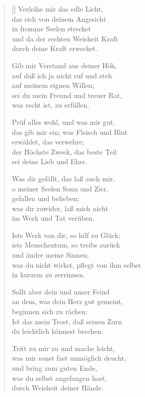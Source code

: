 \begin{multicols}{2}
\begin{verse}[\versewidth]
 Verleihe mir das edle Licht,\\
das sich von deinem Angesicht\\
in fromme Seelen strecket\\
und da der rechten Weisheit Kraft\\
durch deine Kraft erwecket.

 Gib mir Verstand aus deiner Höh,\\
auf daß ich ja nicht ruf und steh\\
auf meinem eignen Willen;\\
sei du mein Freund und treuer Rat,\\
was recht ist, zu erfüllen.

 Prüf alles wohl, und was mir gut,\\
das gib mir ein; was Fleisch und Blut\\
erwählet, das verwehre;\\
der Höchste Zweck, das beste Teil\\
sei deine Lieb und Ehre.

 Was dir gefällt, das laß auch mir,\\
o meiner Seelen Sonn und Zier,\\
gefallen und belieben;\\
was dir zuwider, laß mich nicht\\
im Werk und Tat verüben.

 Ists Werk von dir, so hilf zu Glück;\\
ists Menschentum, so treibs zurück\\
und ändre meine Sinnen;\\
was du nicht wirkst, pflegt von ihm selbst\\
in kurzem zu zerrinnen.

 Sollt aber dein und unser Feind\\
an dem, was dein Herz gut gemeint,\\
beginnen sich zu rächen:\\
Ist das mein Trost, daß seinen Zorn\\
du leichtlich könnest brechen.

 Tritt zu mir zu und mache leicht,\\
was mir sonst fast unmöglich deucht,\\
und bring zum guten Ende,\\
was du selbst angefangen hast,\\
durch Weisheit deiner Hände.


\end{verse}
\end{multicols}
